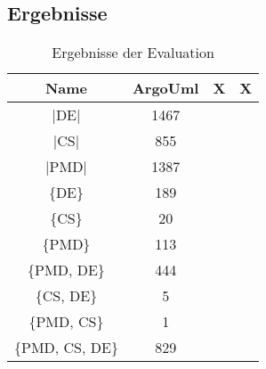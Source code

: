 \subsection{Ergebnisse}


\begin{table}[]
    \centering
    \begin{tabular}{c|c|c|c}
    Name & ArgoUml & X & X\\\hline
    |DE| &1467 & &\\\hline
    |CS| &855 & &\\\hline
    |PMD|&1387 & &\\\hline
    
    \{DE\} &189 & &\\\hline
    \{CS\} &20 & &\\\hline
    \{PMD\} &113 & &\\\hline
    \{PMD, DE\} &444 & &\\\hline
    \{CS, DE\} &5 & &\\\hline
    \{PMD, CS\} & 1& &\\\hline
    \{PMD, CS, DE\} &829 & &\\\hline
    \end{tabular}
    \caption{Ergebnisse der Evaluation}
    \label{tab:eval_results}
\end{table}
\begin{comment}
\section{Unit-Test}
Dir grundlegende Vorgehensweise zur Prüfung, ob ein Programm seinen Anforderung genügt, sind Unit-Tests. Bei Unit-Tests oder auch Modul- oder Komponententests wird eine genau abgegrenzte Komponente des Programms getestet. Dabei werden die Komponente zunächst in einem bestimmten Zustand gebracht, indem beispielsweise bestimmte Eingabeparameter vorgegeben werden. Anschließend werden bestimmte Operationen auf der Komponente angewendet. Am Schluss wird der Zustand der Komponente angefragt und geprüft, ob der Zustand der Komponente nach allen Operationen so ist, wie es gemäß den Anforderungen zu erwarten ist. Gibt es Abweichung beim Zustand, so wird der Entwickler sofort informiert. 

Im Kontext des Programmms wurden die drei Arbeitspakete Traversierung, Parsing und Bewertung durch Metriken getestet.
\end{comment}
